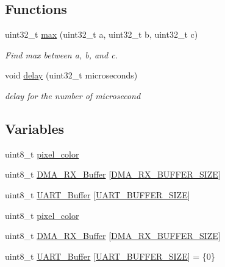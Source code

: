 \subsection*{Functions}
\begin{DoxyCompactItemize}
\item 
uint32\+\_\+t \hyperlink{group___utils_gafa33c555a40e71b0cc32aa3731f6fabe}{max} (uint32\+\_\+t a, uint32\+\_\+t b, uint32\+\_\+t c)
\begin{DoxyCompactList}\small\item\em Find max between a, b, and c. \end{DoxyCompactList}\item 
void \hyperlink{group___utils_gaf1a8629740f19d111a55636a19c2bf08}{delay} (uint32\+\_\+t microseconds)
\begin{DoxyCompactList}\small\item\em delay for the number of microsecond \end{DoxyCompactList}\end{DoxyCompactItemize}
\subsection*{Variables}
\begin{DoxyCompactItemize}
\item 
uint8\+\_\+t \hyperlink{group___utils_ga91a0f4b54880f52e0b02f7aeb96ca304}{pixel\+\_\+color}
\item 
uint8\+\_\+t \hyperlink{group___utils_gaead30033cf45bc8bbfab301a6c770afb}{D\+M\+A\+\_\+\+R\+X\+\_\+\+Buffer} \mbox{[}\hyperlink{group___utils_ga2345ec0af8fc8a1782768a22a15a4ad3}{D\+M\+A\+\_\+\+R\+X\+\_\+\+B\+U\+F\+F\+E\+R\+\_\+\+S\+I\+ZE}\mbox{]}
\item 
uint8\+\_\+t \hyperlink{group___utils_gab42d904ed5954df151e40839a2351427}{U\+A\+R\+T\+\_\+\+Buffer} \mbox{[}\hyperlink{group___utils_ga0d57378e32bf8278011460740bc29f7f}{U\+A\+R\+T\+\_\+\+B\+U\+F\+F\+E\+R\+\_\+\+S\+I\+ZE}\mbox{]}
\item 
uint8\+\_\+t \hyperlink{group___utils_ga91a0f4b54880f52e0b02f7aeb96ca304}{pixel\+\_\+color}
\item 
uint8\+\_\+t \hyperlink{group___utils_gaead30033cf45bc8bbfab301a6c770afb}{D\+M\+A\+\_\+\+R\+X\+\_\+\+Buffer} \mbox{[}\hyperlink{group___utils_ga2345ec0af8fc8a1782768a22a15a4ad3}{D\+M\+A\+\_\+\+R\+X\+\_\+\+B\+U\+F\+F\+E\+R\+\_\+\+S\+I\+ZE}\mbox{]}
\item 
uint8\+\_\+t \hyperlink{group___utils_gab42d904ed5954df151e40839a2351427}{U\+A\+R\+T\+\_\+\+Buffer} \mbox{[}\hyperlink{group___utils_ga0d57378e32bf8278011460740bc29f7f}{U\+A\+R\+T\+\_\+\+B\+U\+F\+F\+E\+R\+\_\+\+S\+I\+ZE}\mbox{]} = \{0\}
\end{DoxyCompactItemize}


